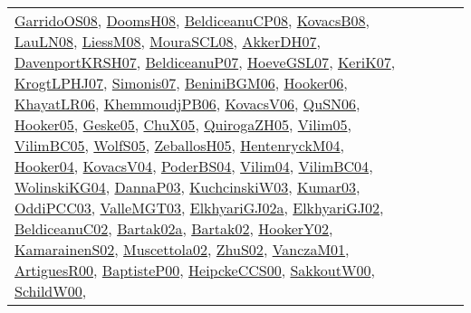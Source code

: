 {\begin{longtable}{lp{3cm}>{\raggedright}p{6cm}>{\raggedright}p{6cm}p{8cm}}
\href{articles/GarridoOS08.pdf}{GarridoOS08}\cite{GarridoOS08}, \href{papers/DoomsH08.pdf}{DoomsH08}\cite{DoomsH08}, \href{papers/BeldiceanuCP08.pdf}{BeldiceanuCP08}\cite{BeldiceanuCP08}, \href{articles/KovacsB08.pdf}{KovacsB08}\cite{KovacsB08}, \href{papers/LauLN08.pdf}{LauLN08}\cite{LauLN08}, \href{articles/LiessM08.pdf}{LiessM08}\cite{LiessM08}, \href{papers/MouraSCL08.pdf}{MouraSCL08}\cite{MouraSCL08}, \href{papers/AkkerDH07.pdf}{AkkerDH07}\cite{AkkerDH07}, \href{papers/DavenportKRSH07.pdf}{DavenportKRSH07}\cite{DavenportKRSH07}, \href{papers/BeldiceanuP07.pdf}{BeldiceanuP07}\cite{BeldiceanuP07}, \href{papers/HoeveGSL07.pdf}{HoeveGSL07}\cite{HoeveGSL07}, \href{papers/KeriK07.pdf}{KeriK07}\cite{KeriK07}, \href{papers/KrogtLPHJ07.pdf}{KrogtLPHJ07}\cite{KrogtLPHJ07}, \href{articles/Simonis07.pdf}{Simonis07}\cite{Simonis07}, \href{papers/BeniniBGM06.pdf}{BeniniBGM06}\cite{BeniniBGM06}, \href{articles/Hooker06.pdf}{Hooker06}\cite{Hooker06}, \href{articles/KhayatLR06.pdf}{KhayatLR06}\cite{KhayatLR06}, \href{papers/KhemmoudjPB06.pdf}{KhemmoudjPB06}\cite{KhemmoudjPB06}, \href{papers/KovacsV06.pdf}{KovacsV06}\cite{KovacsV06}, \href{papers/QuSN06.pdf}{QuSN06}\cite{QuSN06}, \href{articles/Hooker05.pdf}{Hooker05}\cite{Hooker05}, \href{papers/Geske05.pdf}{Geske05}\cite{Geske05}, \href{papers/ChuX05.pdf}{ChuX05}\cite{ChuX05}, \href{papers/QuirogaZH05.pdf}{QuirogaZH05}\cite{QuirogaZH05}, \href{papers/Vilim05.pdf}{Vilim05}\cite{Vilim05}, \href{articles/VilimBC05.pdf}{VilimBC05}\cite{VilimBC05}, \href{papers/WolfS05.pdf}{WolfS05}\cite{WolfS05}, \href{articles/ZeballosH05.pdf}{ZeballosH05}\cite{ZeballosH05}, \href{papers/HentenryckM04.pdf}{HentenryckM04}\cite{HentenryckM04}, \href{papers/Hooker04.pdf}{Hooker04}\cite{Hooker04}, \href{papers/KovacsV04.pdf}{KovacsV04}\cite{KovacsV04}, \href{articles/PoderBS04.pdf}{PoderBS04}\cite{PoderBS04}, \href{papers/Vilim04.pdf}{Vilim04}\cite{Vilim04}, \href{papers/VilimBC04.pdf}{VilimBC04}\cite{VilimBC04}, \href{papers/WolinskiKG04.pdf}{WolinskiKG04}\cite{WolinskiKG04}, \href{papers/DannaP03.pdf}{DannaP03}\cite{DannaP03}, \href{articles/KuchcinskiW03.pdf}{KuchcinskiW03}\cite{KuchcinskiW03}, \href{papers/Kumar03.pdf}{Kumar03}\cite{Kumar03}, \href{papers/OddiPCC03.pdf}{OddiPCC03}\cite{OddiPCC03}, \href{papers/ValleMGT03.pdf}{ValleMGT03}\cite{ValleMGT03}, \href{papers/ElkhyariGJ02a.pdf}{ElkhyariGJ02a}\cite{ElkhyariGJ02a}, \href{papers/ElkhyariGJ02.pdf}{ElkhyariGJ02}\cite{ElkhyariGJ02}, \href{papers/BeldiceanuC02.pdf}{BeldiceanuC02}\cite{BeldiceanuC02}, \href{papers/Bartak02a.pdf}{Bartak02a}\cite{Bartak02a}, \href{papers/Bartak02.pdf}{Bartak02}\cite{Bartak02}, \href{papers/HookerY02.pdf}{HookerY02}\cite{HookerY02}, \href{papers/KamarainenS02.pdf}{KamarainenS02}\cite{KamarainenS02}, \href{papers/Muscettola02.pdf}{Muscettola02}\cite{Muscettola02}, \href{papers/ZhuS02.pdf}{ZhuS02}\cite{ZhuS02}, \href{papers/VanczaM01.pdf}{VanczaM01}\cite{VanczaM01}, \href{articles/ArtiguesR00.pdf}{ArtiguesR00}\cite{ArtiguesR00}, \href{articles/BaptisteP00.pdf}{BaptisteP00}\cite{BaptisteP00}, \href{articles/HeipckeCCS00.pdf}{HeipckeCCS00}\cite{HeipckeCCS00}, \href{articles/SakkoutW00.pdf}{SakkoutW00}\cite{SakkoutW00}, \href{articles/SchildW00.pdf}{SchildW00}\cite{SchildW00}, 
\end{longtable}}
